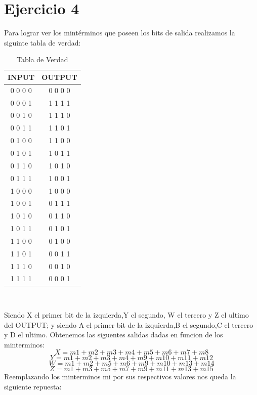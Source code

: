 \documentclass{report}
\begin{document}
\chapter*{Ejercicio 4}

Para lograr ver los mintérminos que poseen los bits de salida realizamos la siguinte tabla de verdad:
\begin{center}
	\begin{table}[h!]
		\begin{center}
			\caption{Tabla de Verdad}
			\begin{tabular}{|c|c|}
				\hline
				\textbf{INPUT} & \textbf{OUTPUT} \\
				\hline
				0 0 0 0 & 0 0 0 0\\
				\hline
				0 0 0 1 & 1 1 1 1\\
				\hline
				0 0 1 0 & 1 1 1 0\\
				\hline
				0 0 1 1 & 1 1 0 1\\
				\hline
				0 1 0 0 & 1 1 0 0\\
				\hline
				0 1 0 1 & 1 0 1 1\\
				\hline
				0 1 1 0 & 1 0 1 0\\
				\hline
				0 1 1 1 & 1 0 0 1\\
				\hline
				1 0 0 0 & 1 0 0 0\\
				\hline
				1 0 0 1 & 0 1 1 1\\
				\hline
				1 0 1 0 & 0 1 1 0\\
				\hline
				1 0 1 1 & 0 1 0 1\\
				\hline
				1 1 0 0 & 0 1 0 0\\
				\hline
				1 1 0 1 & 0 0 1 1\\
				\hline
				1 1 1 0 & 0 0 1 0\\
				\hline
				1 1 1 1 & 0 0 0 1\\
				\hline
			\end{tabular} \\
		\end{center}
	\end{table}
\end{center}
Siendo X el primer bit de la izquierda,Y el segundo, W el tercero y Z el ultimo del OUTPUT; y  siendo A el primer bit de la izquierda,B el segundo,C el tercero y D el ultimo. Obtenemos las siguentes salidas dadas en funcion de los minterminos:
	$$ X= m1+m2+m3+m4+m5+m6+m7+m8$$ 
	$$ Y = m1+m2+m3+m4+m9+m10+m11+m12$$
	$$ W = m1+m2+m5+m6+m9+m10+m13+m14$$
	$$ Z = m1+m3+m5+m7+m9+m11+m13+m15$$
Reemplazando los minterminos mi por sus respectivos valores nos queda la siguiente repuesta:
\end{document}
